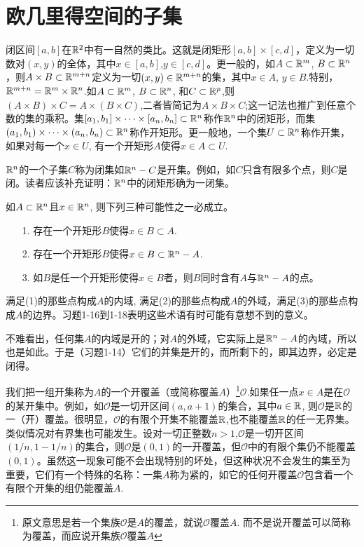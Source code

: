 \section{欧几里得空间的子集}\label{section0090102}
闭区间$[a,b]$在$\mathbb{R}^2$中有一自然的类比。这就是闭矩形$[a,b]\times[c,d]$，定义为一切数对$(x,y)$的全体，其中$x \in [a,b]$,$y \in [c,d]$。更一般的，如$A \subset \mathbb{R}^m$, $B \subset \mathbb{R}^n$，则$A \times B \subset \mathbb{R}^{m+n}$定义为一切$(x, y) \in \mathbb{R}^{m+n}$的集，其中$x \in A$, $y \in B$.特别，$\mathbb{R}^{m+n} = \mathbb{R}^m \times \mathbb{R}^n$.如$A \subset \mathbb{R}^m$, $B \subset \mathbb{R}^n$, 和$C \subset \mathbb{R}^p$,则$(A \times B) \times C = A \times (B \times C)$,二者皆简记为$A \times B \times C$;这一记法也推广到任意个数的集的乘积。集$[a_1, b_1] \times \cdots \times [a_n, b_n] \subset \mathbb{R}^n$称作$\mathbb{R}^n$中的闭矩形，而集$(a_1, b_1) \times \cdots \times (a_n, b_n) \subset \mathbb{R}^n$称作开矩形。更一般地，一个集$U \subset \mathbb{R}^n$称作开集，如果对每一个$x \in U$, 有一个开矩形$A$使得$x \in A \subset U$.

$\mathbb{R}^n$的一个子集$C$称为闭集如$\mathbb{R}^n-C$是开集。例如，如$C$只含有限多个点，则$C$是闭。读者应该补充证明：$\mathbb{R}^n$中的闭矩形确为一闭集。

如$A \subset \mathbb{R}^n$且$x \in \mathbb{R}^n$, 则下列三种可能性之一必成立。
\begin{enumerate}
\item[1.]存在一个开矩形$B$使得$x \in B \subset A$.
\item[2.]存在一个开矩形$B$使得$x \in B \subset \mathbb{R}^n - A$.
\item[3.]如$B$是任一个开矩形使得$x \in B$者，则$B$同时含有$A$与$\mathbb{R}^n-A$的点。
\end{enumerate}

满足(1)的那些点构成$A$的内域, 满足(2)的那些点构成$A$的外域，满足(3)的那些点构成$A$的边界。习题1-16到1-18表明这些术语有时可能有意想不到的意义。

不难看出，任何集$A$的内域是开的；对$A$的外域，它实际上是$\mathbb{R}^n-A$的內域，所以也是如此。于是（习题1-14）它们的并集是开的，而所剩下的，即其边界，必定是闭得。

我们把一组开集称为$A$的一个开覆盖（或简称覆盖$A$）\footnote{原文意思是若一个集族$\mathscr{O}$是$A$的覆盖，就说$\mathscr{O}$覆盖$A$. 而不是说开覆盖可以简称为覆盖，而应说开集族$\mathscr{O}$覆盖$A$}$\mathscr{O}$.如果任一点$x \in A$是在$\mathscr{O}$的某开集中。例如，如$\mathscr{O}$是一切开区间$(a, a+1)$的集合，其中$a \in \mathbb{R}$, 则$\mathscr{O}$是$\mathbb{R}$的一（开）覆盖。很明显，$\mathscr{O}$的有限个开集不能覆盖$\mathbb{R}$,也不能覆盖$\mathbb{R}$的任一无界集。类似情况对有界集也可能发生。设对一切正整数$n>1$,$\mathscr{O}$是一切开区间$(1/n,1-1/n)$的集合，则$\mathscr{O}$是$(0, 1)$的一开覆盖，但$\mathscr{O}$中的有限个集仍不能覆盖$(0, 1)$。虽然这一现象可能不会出现特别的坏处，但这种状况不会发生的集至为重要，它们有一个特殊的名称：一集$A$称为紧的，如它的任何开覆盖$\mathscr{O}$包含着一个有限个开集的组仍能覆盖$A$.

